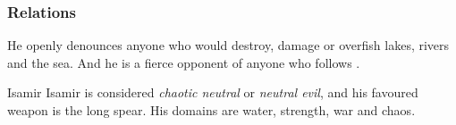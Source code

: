 \subsubsection{Relations}

He openly denounces anyone who would destroy, damage or overfish lakes,
rivers and the sea. And he is a fierce opponent of anyone who follows
.

\begin{35e}{Isamir}
  Isamir is considered \emph{chaotic neutral} or \emph{neutral evil},
  and his favoured weapon is the long spear. His domains are water,
  strength, war and chaos.
\end{35e}
